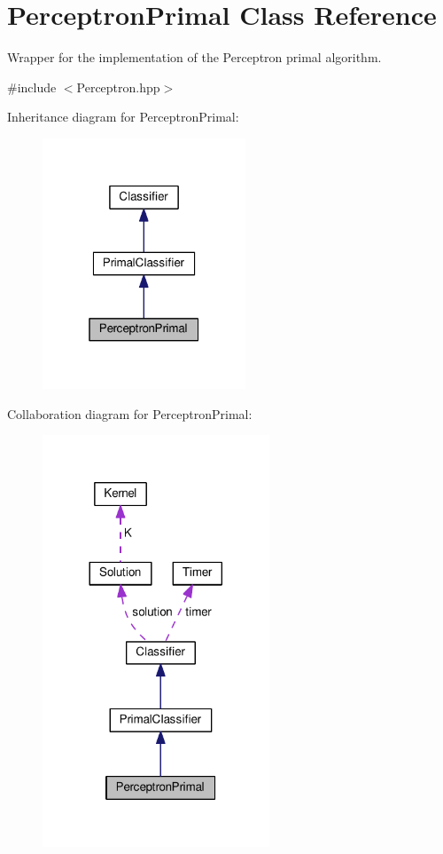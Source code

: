 \hypertarget{class_perceptron_primal}{}\section{Perceptron\+Primal Class Reference}
\label{class_perceptron_primal}


Wrapper for the implementation of the Perceptron primal algorithm.  




{\ttfamily \#include $<$Perceptron.\+hpp$>$}



Inheritance diagram for Perceptron\+Primal\+:\nopagebreak
\begin{figure}[H]
\begin{center}
\leavevmode
\includegraphics[width=172pt]{class_perceptron_primal__inherit__graph}
\end{center}
\end{figure}


Collaboration diagram for Perceptron\+Primal\+:
\nopagebreak
\begin{figure}[H]
\begin{center}
\leavevmode
\includegraphics[width=192pt]{class_perceptron_primal__coll__graph}
\end{center}
\end{figure}
